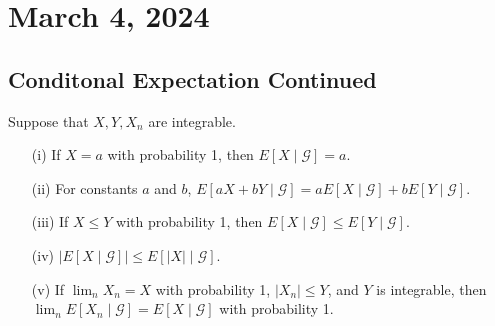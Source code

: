 \newpage
\section{March 4, 2024}
\subsection{Conditonal Expectation Continued}
\begin{theorem}
    Suppose that \(X, Y, X_n\) are integrable.
\begin{enumerate}
    \item[(i)] If \(X = a\) with probability 1, then \(E[X \mid \mathcal{G}] = a\).
    \item[(ii)] For constants \(a\) and \(b\), \(E[aX + bY \mid \mathcal{G}] = aE[X \mid \mathcal{G}] + bE[Y \mid \mathcal{G}]\).
    \item[(iii)] If \(X \leq Y\) with probability 1, then \(E[X \mid \mathcal{G}] \leq E[Y \mid \mathcal{G}]\).
    \item[(iv)] \(|E[X \mid \mathcal{G}]| \leq E[|X| \mid \mathcal{G}]\).
    \item[(v)] If \(\lim_{n} X_n = X\) with probability 1, \(|X_n| \leq Y\), and \(Y\) is integrable, then \(\lim_{n} E[X_n \mid \mathcal{G}] = E[X \mid \mathcal{G}]\) with probability 1.
\end{enumerate}
\end{theorem}
